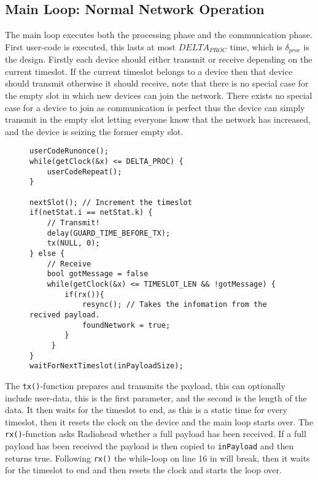 \subsection{Main Loop: Normal Network Operation}
The main loop executes both the processing phase and the communication phase.
First user-code is executed, this lasts at most \texttt{$DELTA_{PROC}$} time, which is $\delta_{proc}$ is the design. 
Firstly each device should either transmit or receive depending on the current timeslot. 
If the current timeslot belongs to a device then that device should transmit otherwise it should receive, note that there is no special case for the empty slot in which new devices can join the network.
There exists no special case for a device to join as communication is perfect thus the device can simply transmit in the empty slot letting everyone know that the network has increased, and the device is seizing the former empty slot.
\begin{figure}
\begin{lstlisting}[style=customc,caption={Important parts of the main loop.},label={lst:ccrc:rxortx}]
userCodeRunonce();
while(getClock(&x) <= DELTA_PROC) {
    userCodeRepeat();
}

nextSlot(); // Increment the timeslot
if(netStat.i == netStat.k) { 
    // Transmit!
    delay(GUARD_TIME_BEFORE_TX);
    tx(NULL, 0);
} else {
    // Receive
    bool gotMessage = false
    while(getClock(&x) <= TIMESLOT_LEN && !gotMessage) {
        if(rx()){
            resync(); // Takes the infomation from the recived payload.
            foundNetwork = true;
        }
     }
}
waitForNextTimeslot(inPayloadSize);
\end{lstlisting}
\end{figure}

The \texttt{tx()}-function prepares and transmits the payload, this can optionally include user-data, this is the first parameter, and the second is the length of the data.
It then waits for the timeslot to end, as this is a static time for every timeslot, then it resets the clock on the device and the main loop starts over.
The \texttt{rx()}-function asks Radiohead whether a full payload has been received. 
If a full payload has been received the payload is then copied to \texttt{inPayload} and then returns true.
Following \texttt{rx()} the while-loop on line 16 in  will break, then it waits for the timeslot to end and then resets the clock and starts the loop over. 